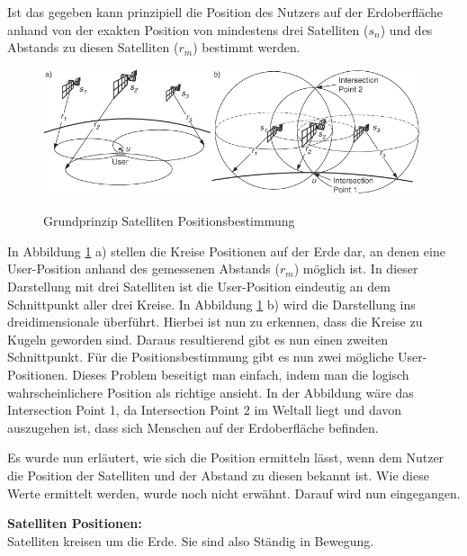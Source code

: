 Ist das gegeben kann prinzipiell die Position des Nutzers auf der Erdoberfläche anhand von der exakten Position von mindestens drei Satelliten ($s_{n}$) und des Abstands zu diesen Satelliten ($r_{m}$) bestimmt werden.

\cite[S. 188]{Schiller2004}


\begin{figure}[h]
\centering
\includegraphics[width=0.99\textwidth]{ref/images/prinzip_satelliten.png}
\caption[Grundprinzip Satelliten Positionsbestimmung]{Grundprinzip Satelliten Positionsbestimmung}
\label{fig:Grundprinzip Satelliten}
\cite[S. 188]{Schiller2004}
\end{figure}

In Abbildung \ref{fig:Grundprinzip Satelliten} a) stellen die Kreise Positionen auf der Erde dar, an denen eine User-Position anhand des gemessenen Abstands ($r_{m}$) möglich ist. In dieser Darstellung mit drei Satelliten ist die User-Position eindeutig an dem Schnittpunkt aller drei Kreise. 
In Abbildung \ref{fig:Grundprinzip Satelliten} b) wird die Darstellung ins dreidimensionale überführt. Hierbei ist nun zu erkennen, dass die Kreise zu Kugeln geworden sind. Daraus resultierend gibt es nun einen zweiten Schnittpunkt. Für die Positionsbestimmung gibt es nun zwei mögliche User-Positionen. Dieses Problem beseitigt man einfach, indem man die logisch wahrscheinlichere Position als richtige ansieht. In der Abbildung wäre das Intersection Point 1, da Intersection Point 2 im Weltall liegt und davon auszugehen ist, dass sich Menschen auf der Erdoberfläche befinden.
\cite[S. 188]{Schiller2004}

Es wurde nun erläutert, wie sich die Position ermitteln lässt, wenn dem Nutzer die Position der Satelliten und der Abstand zu diesen bekannt ist. Wie diese Werte ermittelt werden, wurde noch nicht erwähnt. Darauf wird nun eingegangen.

\textbf{Satelliten Positionen:}\\
Satelliten kreisen um die Erde. Sie sind also Ständig in Bewegung. 

